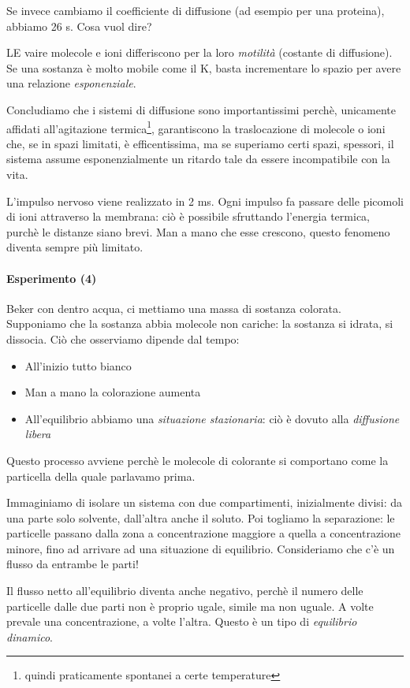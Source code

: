 \documentclass[a4paper,12pt]{article}
\begin{document}
Se invece cambiamo il coefficiente di diffusione (ad esempio per una proteina), abbiamo 26 s. Cosa vuol dire?

LE vaire molecole e ioni differiscono per la loro \emph{motilità} (costante di diffusione). Se una sostanza è molto mobile come il K, basta incrementare lo spazio per avere una relazione \emph{esponenziale}.

Concludiamo che i sistemi di diffusione sono importantissimi perchè, unicamente affidati all'agitazione termica\footnote{quindi praticamente spontanei a certe temperature}, garantiscono la traslocazione di molecole o ioni che, se in spazi limitati, è efficentissima, ma se superiamo certi spazi, spessori, il sistema assume esponenzialmente un ritardo tale da essere incompatibile con la vita. 

L'impulso nervoso viene realizzato in 2 ms. Ogni impulso fa passare delle picomoli di ioni attraverso la membrana: ciò è possibile sfruttando l'energia termica, purchè le distanze siano brevi. Man a mano che esse crescono, questo fenomeno diventa sempre più limitato.

\paragraph{Esperimento (4)}
Beker con dentro acqua, ci mettiamo una massa di sostanza colorata. Supponiamo che la sostanza abbia molecole non cariche: la sostanza si idrata, si dissocia. Ciò che osserviamo dipende dal tempo:
\begin{itemize}
\item{All'inizio tutto bianco}
\item{Man a mano la colorazione aumenta}
\item{All'equilibrio abbiamo una \emph{situazione stazionaria}: ciò è dovuto alla \emph{diffusione libera}}
\end{itemize}

Questo processo avviene perchè le molecole di colorante si comportano come la particella della quale parlavamo prima.

Immaginiamo di isolare un sistema con due compartimenti, inizialmente divisi: da una parte solo solvente, dall'altra anche il soluto. Poi togliamo la separazione: le particelle passano dalla zona a concentrazione maggiore a quella a concentrazione minore, fino ad arrivare ad una situazione di equilibrio.
Consideriamo che c'è un flusso da entrambe le parti!

Il flusso netto all'equilibrio diventa anche negativo, perchè il numero delle particelle dalle due parti non è proprio ugale, simile ma non uguale. A volte prevale una concentrazione, a volte l'altra. Questo è un tipo di \emph{equilibrio dinamico}.
\end{document}
